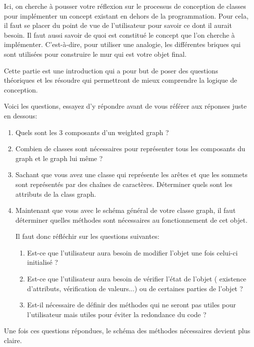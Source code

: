 Ici, on cherche à pousser votre réflexion sur le processus de conception de classes pour implémenter un concept existant en dehors de la programmation.
Pour cela, il faut se placer du point de vue de l'utilisateur pour savoir ce dont il aurait besoin. 
Il faut aussi savoir de quoi est constitué le concept que l'on cherche à implémenter. C'est-à-dire, pour utiliser une analogie, les différentes briques qui sont utilisées pour construire le mur qui est votre objet final.

Cette partie est une introduction qui a pour but de poser des questions théoriques et les résoudre qui permettront de mieux comprendre la logique de conception.

Voici les questions, essayez d'y répondre avant de vous référer aux réponses juste en dessous:

    \begin{enumerate}
        \item Quels sont les 3 composants d'un weighted graph ?
        \item Combien de classes sont nécessaires pour représenter tous les composants du graph et le graph lui même ?
        \item Sachant que vous avez une classe qui représente les arêtes et que les sommets sont représentés par des chaînes de caractères. Déterminer quels sont les attributs de la class graph.
        \item Maintenant que vous avec le schéma général de votre classe graph, il faut déterminer quelles méthodes sont nécessaires au fonctionnement de cet objet.
        
        Il faut donc réfléchir sur les questions suivantes:
            \begin{enumerate}
            \item Est-ce que l'utilisateur aura besoin de modifier l'objet une fois celui-ci initialisé ?
            \item Est-ce que l'utilisateur aura besoin de vérifier l'état de l'objet ( existence d'attributs, vérification de valeurs...) ou de certaines parties de l'objet ?
            \item Est-il nécessaire de définir des méthodes qui ne seront pas utiles pour l'utilisateur mais utiles pour éviter la redondance du code ?
            \end{enumerate}
    \end{enumerate}
    Une fois ces questions répondues, le schéma des méthodes nécessaires devient plus claire.
    

